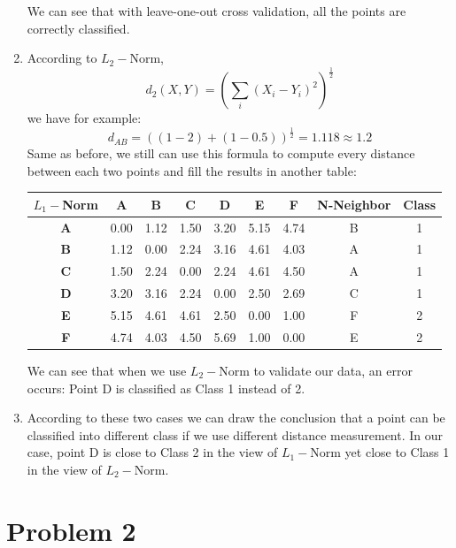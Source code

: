 \documentclass[12pt]{scrartcl}
\begin{document}
\begin{enumerate}[label=\alph*)]
We can see that with leave-one-out cross validation, all the points are correctly classified.
     \item 
According to $L_2-$Norm,
\[d_2(X, Y) = \left( \sum_{i}(X_i - Y_i)^2 \right)^{\frac{1}{2}}\]
we have for example:
\[d_{AB} = \left((1 - 2) + (1 - 0.5)\right)^{\frac{1}{2}} = 1.118 \approx 1.2\]  
Same as before, we still can use this formula to compute every distance between each two points and fill the results in another table:
\begin{table}[h!]
  \begin{center}
    \begin{tabular}{c|c|c|c|c|c|c|c|c} %
      \textbf{$L_1-$Norm} & \textbf{A} & \textbf{B} & \textbf{C} & \textbf{D} & \textbf{E} & \textbf{F} & \textbf{N-Neighbor} & \textbf{Class}\\
      \hline
      \textbf{A} & 0.00 & \color{red}1.12 & 1.50 & 3.20 & 5.15 & 4.74 & B & 1\\
      \textbf{B} & \color{red}1.12 & 0.00 & 2.24 & 3.16 & 4.61 & 4.03 & A & 1\\
      \textbf{C} & \color{red}1.50 & 2.24 & 0.00 & 2.24 & 4.61 & 4.50 & A & 1\\
      \textbf{D} & 3.20 & 3.16 & \color{red}2.24 & 0.00 & 2.50 & 2.69 & C & \color{blue}1\\
      \textbf{E} & 5.15 & 4.61 & 4.61 & 2.50 & 0.00 & \color{red}1.00 & F & 2\\
      \textbf{F} & 4.74 & 4.03 & 4.50 & 5.69 & \color{red}1.00 & 0.00 & E & 2\\
    \end{tabular}
  \end{center}
\end{table}

We can see that when we use $L_2-$Norm to validate our data, an error occurs: Point D is classified as Class 1 instead of 2.
     \item
According to these two cases we can draw the conclusion that a point can be classified into different class if we use different distance measurement. In our case, point D is close to Class 2 in the view of $L_1-$Norm yet close to Class 1 in the view of $L_2-$Norm.
\end{enumerate}

  \section*{Problem 2}
 
\end{document}
